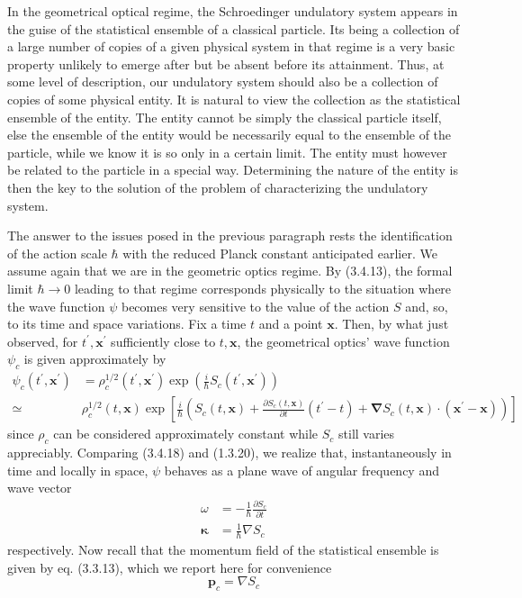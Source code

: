 \documentclass{article}
\begin{document}
In the geometrical optical regime, the Schroedinger undulatory system appears in the guise of the statistical ensemble of a classical particle. Its being a collection of a large number of copies of a given physical system in that regime is a very basic property unlikely to emerge after but be absent before its attainment. Thus, at some level of description, our undulatory system should also be a collection of copies of some physical entity. It is natural to view the collection as the statistical ensemble of the entity. The entity cannot be simply the classical particle itself, else the ensemble of the entity would be necessarily equal to the ensemble of the particle, while we know it is so only in a certain limit. The entity must however be related to the particle in a special way. Determining the nature of the entity is then the key to the solution of the problem of characterizing the undulatory system.

The answer to the issues posed in the previous paragraph rests the identification of the action scale $\hbar$ with the reduced Planck constant anticipated earlier. We assume again that we are in the geometric optics regime. By (3.4.13), the formal limit $\hbar \rightarrow 0$ leading to that regime corresponds physically to the situation where the wave function $\psi$ becomes very sensitive to the value of the action $S$ and, so, to its time and space variations. Fix a time $t$ and a point $\boldsymbol{x}$. Then, by what just observed, for $t^{\prime}, \boldsymbol{x}^{\prime}$ sufficiently close to $t, \boldsymbol{x}$, the geometrical optics' wave function $\psi_{c}$ is given approximately by
$$
\begin{align*}
\psi_{c}\left(t^{\prime}, \boldsymbol{x}^{\prime}\right) & =\rho_{c}^{1 / 2}\left(t^{\prime}, \boldsymbol{x}^{\prime}\right) \exp \left(\frac{i}{\hbar} S_{c}\left(t^{\prime}, \boldsymbol{x}^{\prime}\right)\right)  \tag{3.4.18}\\
\simeq & \rho_{c}^{1 / 2}(t, \boldsymbol{x}) \exp \left[\frac{i}{\hbar}\left(S_{c}(t, \boldsymbol{x})+\frac{\partial S_{c}(t, \boldsymbol{x})}{\partial t}\left(t^{\prime}-t\right)+\boldsymbol{\nabla} S_{c}(t, \boldsymbol{x}) \cdot\left(\boldsymbol{x}^{\prime}-\boldsymbol{x}\right)\right)\right]
\end{align*}
$$
since $\rho_{c}$ can be considered approximately constant while $S_{c}$ still varies appreciably. Comparing (3.4.18) and (1.3.20), we realize that, instantaneously in time and locally in space, $\psi$ behaves as a plane wave of angular frequency and wave vector
$$
\begin{align*}
\omega & =-\frac{1}{\hbar} \frac{\partial S_{c}}{\partial t}  \tag{3.4.19a}\\
\boldsymbol{\kappa} & =\frac{1}{\hbar} \nabla S_{c} \tag{3.4.19b}
\end{align*}
$$
respectively. Now recall that the momentum field of the statistical ensemble is given by eq. (3.3.13), which we report here for convenience
$$
\begin{equation*}
\boldsymbol{p}_{c}=\nabla S_{c} \tag{3.4.20}
\end{equation*}
$$
\end{document}
